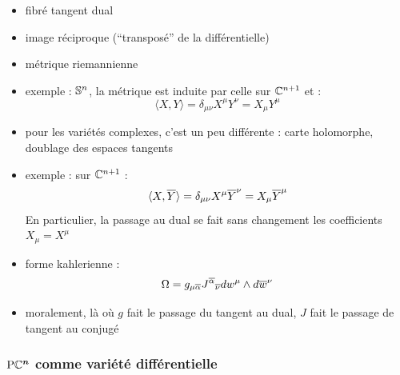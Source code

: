 \begin{itemize}
	
	\item fibré tangent dual
	
	\item image réciproque (``transposé'' de la différentielle)
	
	\item métrique riemannienne
	
	\item exemple : $\S{n}$, la métrique est induite par celle sur $\C^{n+1}$ et :
	\[\langle X, Y\rangle = \delta_{\mu \nu}X^\mu Y^\nu = X_\mu Y^\mu\]

	\item pour les variétés complexes, c'est un peu différente : carte holomorphe, doublage des espaces tangents
	
	\item exemple : sur $\C^{n+1}$ :
	\[\langle X, \congu{Y}\rangle = \delta_{\mu \nu}X^\mu \congu{Y}^\nu = X_\mu \congu{Y}^\mu\]
	En particulier, la passage au dual se fait sans changement les coefficients $X_\mu = X^\mu$
	
	\item forme kahlerienne :
	\begin{equation}
		\Omega = g_{\mu \congu{\alpha}} {J^{\congu{\alpha}}}_{\congu{\nu}} dw^\mu \wedge d\congu{w}^\nu
	\end{equation}
	
	\item moralement, là où $g$ fait le passage du tangent au dual, $J$ fait le passage de tangent au conjugé
	
\end{itemize}



\subsubsection{$\bf{\PC{n}}$ comme variété différentielle} \label{subsec:PC^n_variet}

